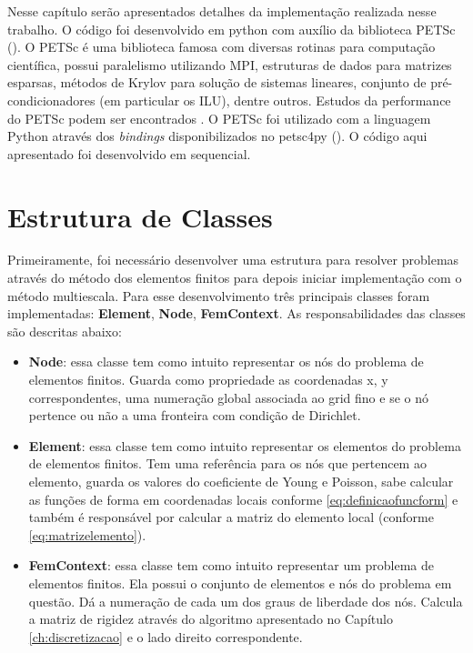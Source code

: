 Nesse capítulo serão apresentados detalhes da implementação realizada nesse trabalho. O código foi desenvolvido em python com auxílio da biblioteca PETSc (\citet{petsc-user-ref}). O PETSc é uma biblioteca famosa com diversas rotinas para computação científica, possui paralelismo utilizando MPI, estruturas de dados para matrizes esparsas, métodos de Krylov para solução de sistemas lineares, conjunto de pré-condicionadores (em particular os ILU), dentre outros. Estudos da performance do PETSc podem ser encontrados \citet{petsc-efficient}. O PETSc foi utilizado com a linguagem Python através dos \textit{bindings} disponibilizados no petsc4py (\citet{Dalcin2011}). O código aqui apresentado foi desenvolvido em sequencial. 



\section{Estrutura de Classes}

Primeiramente, foi necessário desenvolver uma estrutura para resolver problemas através do método dos elementos finitos para depois iniciar implementação com o método multiescala. Para esse desenvolvimento três principais classes foram implementadas: \textbf{Element}, \textbf{Node}, \textbf{FemContext}. As responsabilidades das classes são descritas abaixo:

\begin{itemize}
    \item \textbf{Node}: essa classe tem como intuito representar os nós do problema de elementos finitos. Guarda como propriedade as coordenadas x, y correspondentes, uma numeração global associada ao grid fino e se o nó pertence ou não a uma fronteira com condição de Dirichlet.
    \item \textbf{Element}: essa classe tem como intuito representar os elementos do problema de elementos finitos. Tem uma referência para os nós que pertencem ao elemento, guarda os valores do coeficiente de Young e Poisson, sabe calcular as funções de forma em coordenadas locais conforme \eqref{eq:definicaofuncform} e também é responsável por calcular a matriz do elemento local (conforme \eqref{eq:matrizelemento}).
    \item \textbf{FemContext}: essa classe tem como intuito representar um problema de elementos finitos. Ela possui o conjunto de elementos e nós do problema em questão. Dá a numeração de cada um dos graus de liberdade dos nós. Calcula a matriz de rigidez através do algoritmo apresentado no Capítulo \ref{ch:discretizacao} e o lado direito correspondente. 
\end{itemize}

